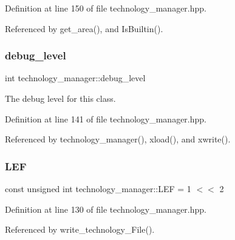Definition at line 150 of file technology\+\_\+manager.\+hpp.



Referenced by get\+\_\+area(), and Is\+Builtin().

\mbox{\label{classtechnology__manager_a7e86acf1f25325a4ce1e25ac2aca64a8}} 
\subsubsection{\texorpdfstring{debug\+\_\+level}{debug\_level}}
{\footnotesize\ttfamily int technology\+\_\+manager\+::debug\+\_\+level\hspace{0.3cm}{\ttfamily [private]}}



The debug level for this class. 



Definition at line 141 of file technology\+\_\+manager.\+hpp.



Referenced by technology\+\_\+manager(), xload(), and xwrite().

\mbox{\label{classtechnology__manager_a95297bf9462e6c57d648a588b28220fd}} 
\subsubsection{\texorpdfstring{L\+EF}{LEF}}
{\footnotesize\ttfamily const unsigned int technology\+\_\+manager\+::\+L\+EF = 1 $<$$<$ 2\hspace{0.3cm}{\ttfamily [static]}}



Definition at line 130 of file technology\+\_\+manager.\+hpp.



Referenced by write\+\_\+technology\+\_\+\+File().

\mbox{\label{classtechnology__manager_a96f8db8f26d28892091b5320bfc239cd}} 
